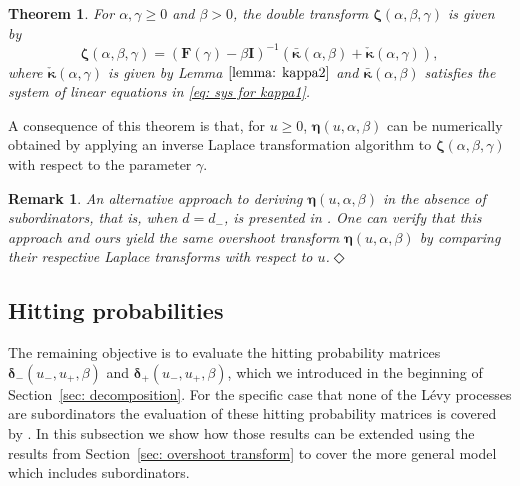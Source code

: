 \documentclass[reqno,12pt]{amsart}
\newcommand{\bs}{\boldsymbol}
\newtheorem{theorem}{Theorem}
\newtheorem{remark}{Remark}
\begin{document}
{\begin{theorem}\label{thrm: eta}
    For $\alpha,\gamma\geqslant0$ and $\beta>0$, the double transform $\bs{\zeta}(\alpha,\beta,\gamma)$ is given by
    \begin{equation*}
        \bs{\zeta}(\alpha,\beta,\gamma) = (\bs{F}(\gamma)-\beta\bs{I})^{-1}\left( \bar{\bs \kappa}(\alpha,\beta)+\check{\bs \kappa}(\alpha,\gamma)\right),
    \end{equation*}
    where $\check{\bs{\kappa}}(\alpha,\gamma)$ is given by Lemma $\ref{lemma: kappa2}$ and $\bar{\bs \kappa}(\alpha,\beta)$ satisfies the system of linear equations in \eqref{eq: sys for kappa1}.
\end{theorem}
 A consequence of this theorem is that, for $u\geqslant0$, $\bs{\eta}(u,\alpha,\beta)$ can be numerically obtained by applying an inverse Laplace transformation algorithm to $\bs{\zeta}(\alpha,\beta,\gamma)$ with respect to the parameter $\gamma$.

\begin{remark}\label{remark: eta Ivanovs}{\em 
   An alternative approach to deriving $\bs\eta(u,\alpha,\beta)$ in the absence of subordinators, that is, when $d=d_-$, is presented in \cite[Corollary 4]{IP}. One can verify that this approach and ours yield the same overshoot transform $\bs\eta(u,\alpha,\beta)$ by comparing their respective Laplace transforms with respect to $u$.}\hfill$\Diamond$
\end{remark}


\subsection{Hitting probabilities}\label{sec: hitting probabilities}
The remaining objective is to evaluate the hitting probability matrices ${\bs \delta}_{-}(u_-, u_+, \beta)$ and ${\bs \delta}_{+}(u_-, u_+, \beta)$, which we introduced in the beginning of Section~\ref{sec: decomposition}. For the specific case that none of the L\'evy processes are subordinators the evaluation of these hitting probability matrices is covered by \cite{IP}. In this subsection we show how those results can be extended using the results from Section~\ref{sec: overshoot transform} to cover the more general model which includes subordinators. 

}
\end{document}
